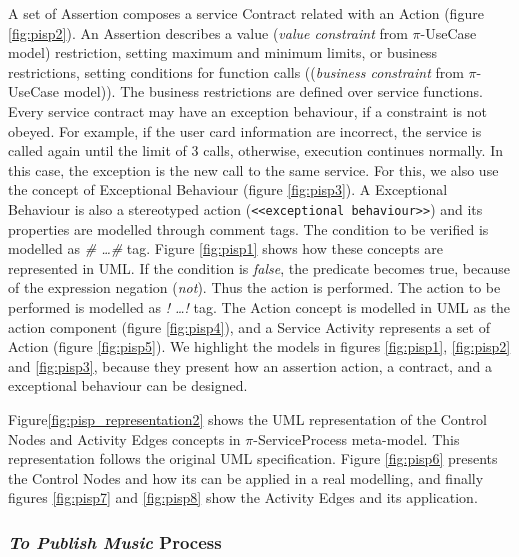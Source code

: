 A set of {\sc Assertion} composes a service {\sc Contract} related with an {\sc
Action} (figure \ref{fig:pisp2}).  An Assertion describes a value (\textit{value
constraint} from $\pi$-UseCase model) restriction, setting maximum and minimum
limits, or business restrictions, setting conditions for function calls
((\textit{business constraint} from $\pi$-UseCase model)). The
business restrictions are defined over service functions. Every service contract
may have an exception behaviour, if a constraint is not obeyed. For example, if the
user card information are incorrect, the service is called again until the limit
of 3 calls, otherwise, execution continues normally. In this case, the exception
is the new call to the same service. For this, we also use the concept of {\sc
Exceptional Behaviour} (figure \ref{fig:pisp3}). A {\sc Exceptional Behaviour}
is also a stereotyped action (\texttt{<<exceptional behaviour>>}) and its
properties are modelled through comment tags. The condition to be verified is
modelled as \textit{\# \ldots \#} tag. Figure \ref{fig:pisp1} shows how these
concepts are represented in UML. If the condition is \textit{false}, the
predicate becomes true, because of the expression negation
(\textit{not}). Thus the action is performed. The action to be performed is
modelled as \textit{! \ldots !} tag. The {\sc Action} concept is modelled in UML
as the action component (figure \ref{fig:pisp4}), and a {\sc Service Activity}
represents a set of {\sc Action} (figure \ref{fig:pisp5}). 
We highlight the models in figures \ref{fig:pisp1}, \ref{fig:pisp2} and
\ref{fig:pisp3}, because they present how an assertion action, a contract, and a
exceptional behaviour can be designed.

Figure\ref{fig:pisp_representation2}
shows the UML representation of the {\sc Control Nodes} and {\sc Activity Edges}
concepts in $\pi$-ServiceProcess meta-model. This representation follows the
original UML specification. Figure \ref{fig:pisp6} presents the
{\sc Control Nodes} and how its can be applied in a real modelling, and finally
figures \ref{fig:pisp7} and \ref{fig:pisp8} show the {\sc Activity Edges} and
its application. 

 

\subsubsection{\textit{To Publish Music} Process}



